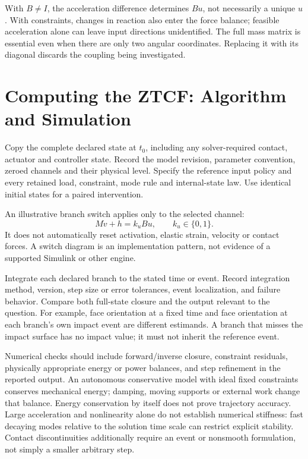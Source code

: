 With $B\ne I$, the acceleration difference determines $Bu$, not necessarily a unique $u$. With constraints, changes in reaction also enter the force balance; feasible acceleration alone can leave input directions unidentified. The full mass matrix is essential even when there are only two angular coordinates. Replacing it with its diagonal discards the coupling being investigated.

\section{Computing the ZTCF: Algorithm and Simulation}
\label{sec:ztcf_algorithm}

Copy the complete declared state at $t_0$, including any solver-required contact, actuator and controller state. Record the model revision, parameter convention, zeroed channels and their physical level. Specify the reference input policy and every retained load, constraint, mode rule and internal-state law. Use identical initial states for a paired intervention.

An illustrative branch switch applies only to the selected channel:
\begin{equation}
M\dot v+h=k_u Bu,\qquad k_u\in\{0,1\}.
\label{eq:ztcf_kill_switch}
\end{equation}
It does not automatically reset activation, elastic strain, velocity or contact forces. A switch diagram is an implementation pattern, not evidence of a supported Simulink or other engine.

Integrate each declared branch to the stated time or event. Record integration method, version, step size or error tolerances, event localization, and failure behavior. Compare both full-state closure and the output relevant to the question. For example, face orientation at a fixed time and face orientation at each branch's own impact event are different estimands. A branch that misses the impact surface has no impact value; it must not inherit the reference event.

Numerical checks should include forward/inverse closure, constraint residuals, physically appropriate energy or power balances, and step refinement in the reported output. An autonomous conservative model with ideal fixed constraints conserves mechanical energy; damping, moving supports or external work change that balance. Energy conservation by itself does not prove trajectory accuracy. Large acceleration and nonlinearity alone do not establish numerical stiffness: fast decaying modes relative to the solution time scale can restrict explicit stability. Contact discontinuities additionally require an event or nonsmooth formulation, not simply a smaller arbitrary step.

